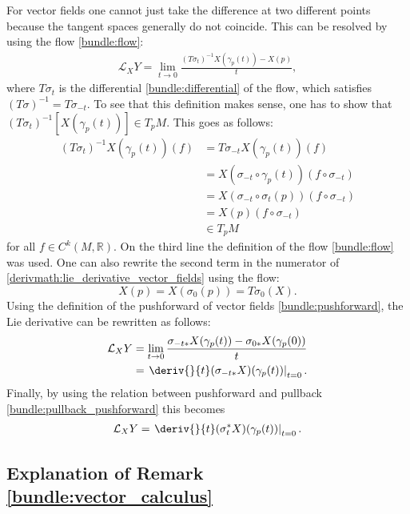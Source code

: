    For vector fields one cannot just take the difference at two different points because the tangent spaces generally do not coincide. This can be resolved by using the flow \ref{bundle:flow}:
    \begin{gather}
        \label{derivmath:lie_derivative_vector_fields}
        \mathcal{L}_XY = \lim_{t\rightarrow0}\frac{(T\sigma_t)^{-1}X(\gamma_p(t)) - X(p)}{t},
    \end{gather}
    where $T\sigma_t$ is the differential \ref{bundle:differential} of the flow, which satisfies $(T\sigma)^{-1} = T\sigma_{-t}$. To see that this definition makes sense, one has to show that $(T\sigma_t)^{-1}[X(\gamma_p(t))]\in T_pM$. This goes as follows:
    \begin{align*}
        (T\sigma_t)^{-1}X(\gamma_p(t))(f) &= T\sigma_{-t}X(\gamma_p(t))(f)\\
        &= X(\sigma_{-t}\circ\gamma_p(t))(f\circ\sigma_{-t})\\
        &= X(\sigma_{-t}\circ\sigma_t(p))(f\circ\sigma_{-t})\\
        &= X(p)(f\circ\sigma_{-t})\\
        &\in T_pM
    \end{align*}
    for all $f\in C^k(M,\mathbb{R})$. On the third line the definition of the flow \ref{bundle:flow} was used. One can also rewrite the second term in the numerator of \eqref{derivmath:lie_derivative_vector_fields} using the flow: \[X(p) = X(\sigma_0(p)) = T\sigma_0(X).\] Using the definition of the pushforward of vector fields \eqref{bundle:pushforward}, the Lie derivative can be rewritten as follows:
    \begin{align*}
        \mathcal{L}_XY &= \lim_{t\rightarrow0}\frac{\sigma_{-t*}X(\gamma_p(t)) - \sigma_{0*}X(\gamma_p(0))}{t}\\
        &= \left.\deriv{}{t}(\sigma_{-t*}X)(\gamma_p(t))\right|_{t=0}.
    \end{align*}
    Finally, by using the relation between pushforward and pullback \eqref{bundle:pullback_pushforward} this becomes
    \begin{gather}
        \mathcal{L}_XY = \left.\deriv{}{t}(\sigma_t^*X)(\gamma_p(t))\right|_{t=0}.
    \end{gather}

\subsection{Explanation of Remark \ref{bundle:vector_calculus}}

